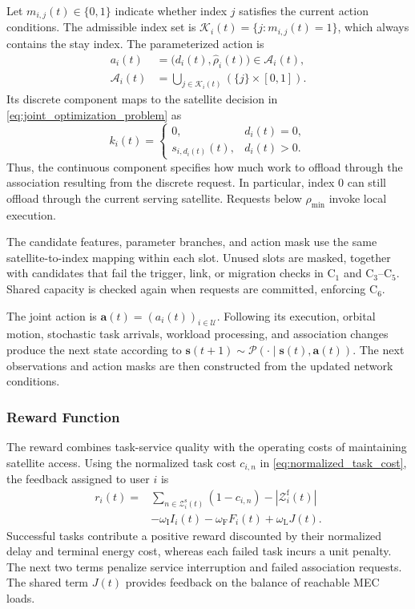 \documentclass[journal]{IEEEtran}
\begin{document}
Let $m_{i,j}(t)\in\{0,1\}$ indicate whether
index $j$ satisfies the current action conditions.
The admissible index set is
$\mathcal{K}_i(t)=\{j:m_{i,j}(t)=1\}$,
which always contains the stay index.
The parameterized action is
\begin{equation}
\begin{aligned}
a_i(t)
&=
\big(d_i(t),\widehat{\rho}_i(t)\big)
\in\mathcal{A}_i(t),\\
\mathcal{A}_i(t)
&=
\bigcup_{j\in\mathcal{K}_i(t)}
\left(\{j\}\times[0,1]\right).
\end{aligned}
\label{eq:rl_parameterized_action_space}
\end{equation}
Its discrete component maps to the satellite
decision in \eqref{eq:joint_optimization_problem} as
\[
k_i(t)
=
\begin{cases}
0, & d_i(t)=0,\\
s_{i,d_i(t)}(t), & d_i(t)>0.
\end{cases}
\]
Thus, the continuous component specifies how much
work to offload through the association resulting
from the discrete request.
In particular, index $0$ can still offload through
the current serving satellite.
Requests below $\rho_{\min}$ invoke local execution.

The candidate features, parameter branches, and
action mask use the same satellite-to-index mapping
within each slot.
Unused slots are masked, together with candidates
that fail the trigger, link, or migration checks
in $\mathrm{C}_1$ and
$\mathrm{C}_3$--$\mathrm{C}_5$.
Shared capacity is checked again when requests
are committed, enforcing $\mathrm{C}_6$.

The joint action is
$\mathbf{a}(t)=(a_i(t))_{i\in\mathcal{U}}$.
Following its execution, orbital motion,
stochastic task arrivals, workload processing,
and association changes produce the next state
according to
$\mathbf{s}(t+1)\sim
\mathcal{P}(\cdot\mid\mathbf{s}(t),\mathbf{a}(t))$.
The next observations and action masks are then
constructed from the updated network conditions.

\subsubsection{Reward Function}

The reward combines task-service quality with
the operating costs of maintaining satellite access.
Using the normalized task cost
$c_{i,n}$ in \eqref{eq:normalized_task_cost},
the feedback assigned to user $i$ is
\begin{equation}
\begin{aligned}
r_i(t)
={}&
\sum_{n\in\mathcal{Z}_i^{\mathrm{s}}(t)}
(1-c_{i,n})
-
|\mathcal{Z}_i^{\mathrm{f}}(t)|\\
&-\omega_{\mathrm I}I_i(t)
-\omega_{\mathrm F}F_i(t)
+\omega_{\mathrm L}J(t).
\end{aligned}
\label{eq:pdqn_user_reward}
\end{equation}
Successful tasks contribute a positive reward
discounted by their normalized delay and
terminal energy cost, whereas each failed task
incurs a unit penalty.
The next two terms penalize service interruption
and failed association requests.
The shared term $J(t)$ provides feedback on
the balance of reachable MEC loads.
\end{document}
